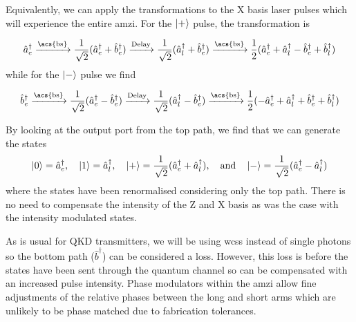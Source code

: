 Equivalently, we can apply the transformations to the X basis laser pulses which will experience the entire \ac{amzi}. For the $\ket{+}$ pulse, the transformation is




\begin{equation}
	\hat{a}^\dagger_e \xrightarrow{\text{\acs{bs}}} \frac{1}{\sqrt{2}} (\hat{a}^\dagger_e + \hat{b}^\dagger_e) \xrightarrow{\text{Delay}} \frac{1}{\sqrt{2}} (\hat{a}^\dagger_l + \hat{b}^\dagger_e) \xrightarrow{\text{\acs{bs}}} \frac{1}{2}(\hat{a}^\dagger_e + \hat{a}^\dagger_l - \hat{b}^\dagger_e + \hat{b}^\dagger_l)
\end{equation}
while for the $\ket{-}$ pulse we find

\begin{equation}
	\hat{b}^\dagger_e \xrightarrow{\text{\acs{bs}}} \frac{1}{\sqrt{2}} (\hat{a}^\dagger_e - \hat{b}^\dagger_e) \xrightarrow{\text{Delay}} \frac{1}{\sqrt{2}} (\hat{a}^\dagger_l - \hat{b}^\dagger_e) \xrightarrow{\text{\acs{bs}}} \frac{1}{2}(- \hat{a}^\dagger_e + \hat{a}^\dagger_l + \hat{b}^\dagger_e + \hat{b}^\dagger_l)
\end{equation}

\noindent By looking at the output port from the top path, we find that we can generate the states
\begin{align}
	\ket{0} = \hat{a}^\dagger_e, \quad \ket{1} = \hat{a}^\dagger_l, \quad \ket{+} = \frac{1}{\sqrt{2}}(\hat{a}^\dagger_e + \hat{a}^\dagger_l),  \quad \text{and} \quad \ket{-} = \frac{1}{\sqrt{2}}(\hat{a}^\dagger_e - \hat{a}^\dagger_l)
\end{align}
where the states have been renormalised considering only the top path. There is no need to compensate the intensity of the Z and X basis as was the case with the intensity modulated states. 

As is usual for \ac{QKD} transmitters, we will be using \acp{wcs} instead of single photons so the bottom path ($\hat{b}^\dagger$) can be considered a loss. However, this loss is before the states have been sent through the quantum channel so can be compensated with an increased pulse intensity. Phase modulators within the \ac{amzi} allow fine adjustments of the relative phases between the long and short arms which are unlikely to be phase matched due to fabrication tolerances. 

